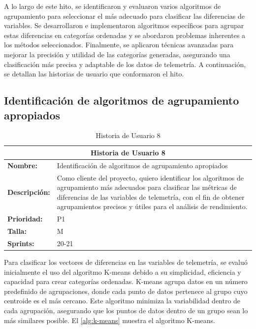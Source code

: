 A lo largo de este hito, se identificaron y evaluaron varios algoritmos de agrupamiento para seleccionar el más adecuado para clasificar las diferencias de variables. Se desarrollaron e implementaron algoritmos específicos para agrupar estas diferencias en categorías ordenadas y se abordaron problemas inherentes a los métodos seleccionados. Finalmente, se aplicaron técnicas avanzadas para mejorar la precisión y utilidad de las categorías generadas, asegurando una clasificación más precisa y adaptable de los datos de telemetría. A continuación, se detallan las historias de usuario que conformaron el hito.

\subsection{Identificación de algoritmos de agrupamiento apropiados}
\begin{table}[H]
\centering
\begin{tabular}{|l|p{10cm}|}
\hline
\multicolumn{2}{|c|}{\textbf{Historia de Usuario 8}} \\ \hline
\textbf{Nombre:} & Identificación de algoritmos de agrupamiento apropiados \\ \hline
\textbf{Descripción:} & Como cliente del proyecto, quiero identificar los algoritmos de agrupamiento más adecuados para clasificar las métricas de diferencias de las variables de telemetría, con el fin de obtener agrupamientos precisos y útiles para el análisis de rendimiento. \\ \hline
\textbf{Prioridad:} & P1 \\ \hline
\textbf{Talla:} & M \\ \hline
\textbf{Sprints:} & 20-21 \\ \hline
\end{tabular}
\caption{Historia de Usuario 8}
\label{tab:identificar_algoritmos_agrupamiento}
\end{table}

Para clasificar los vectores de diferencias en las variables de telemetría, se evaluó inicialmente el uso del algoritmo K-means debido a su simplicidad, eficiencia y capacidad para crear categorías ordenadas. K-means agrupa datos en un número predefinido de agrupaciones, donde cada punto de datos pertenece al grupo cuyo centroide es el más cercano. Este algoritmo minimiza la variabilidad dentro de cada agrupación, asegurando que los puntos de datos dentro de un grupo sean lo más similares posible. El \autoref{alg:k-means} muestra el algoritmo K-means.

